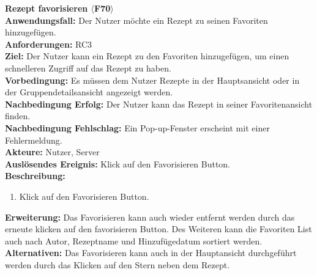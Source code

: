 \documentclass[parskip=full]{scrartcl}
\begin{document}
\textbf{Rezept favorisieren $\langle$F70$\rangle$}\\
\textbf{Anwendungsfall:} Der Nutzer möchte ein Rezept zu seinen Favoriten hinzugefügen.\\
\textbf{Anforderungen:} RC3\\
\textbf{Ziel:} Der Nutzer kann ein Rezept zu den Favoriten hinzugefügen, um einen schnelleren Zugriff auf das Rezept zu haben.\\
\textbf{Vorbedingung:} Es müssen dem Nutzer Rezepte in der Hauptsansicht oder in der Gruppendetailsansicht angezeigt werden.\\
\textbf{Nachbedingung Erfolg:} Der Nutzer kann das Rezept in seiner Favoritenansicht finden.\\
\textbf{Nachbedingung Fehlschlag:} Ein Pop-up-Fenster erscheint mit einer Fehlermeldung.\\
\textbf{Akteure:} Nutzer, Server\\
\textbf{Auslösendes Ereignis:} Klick auf den Favorisieren Button.\\
\textbf{Beschreibung:}
\begin{enumerate}
    \item Klick auf den Favorisieren Button.
\end{enumerate}
\textbf{Erweiterung:} Das Favorisieren kann auch wieder entfernt werden durch das erneute klicken auf den favorisieren Button. Des Weiteren kann die Favoriten List auch nach Autor, Rezeptname und Hinzufügedatum sortiert werden.\\
\textbf{Alternativen:} Das Favorisieren kann auch in der Hauptansicht durchgeführt werden durch das Klicken auf den Stern neben dem Rezept.\\
\newpage
\end{document}
